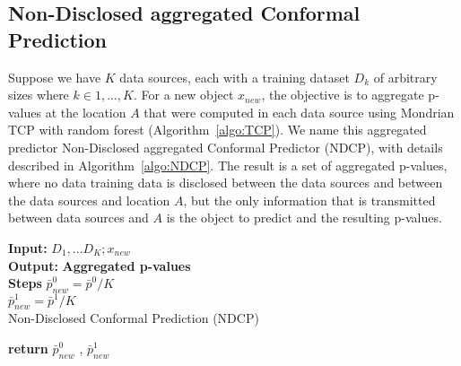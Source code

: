 \documentclass[main]{subfiles}
\begin{document}
\subsection{Non-Disclosed aggregated Conformal Prediction}
%
Suppose we have $K$ data sources, each with a training dataset $D_k$ of arbitrary sizes where $k \in {1,...,K}$. For a new object $x_{new}$, the objective is to aggregate p-values at the location $A$ that were computed in each data source using Mondrian TCP with random forest (Algorithm~\ref{algo:TCP}). We name this aggregated predictor Non-Disclosed aggregated Conformal Predictor (NDCP), with details described in Algorithm~\ref{algo:NDCP}. The result is a set of aggregated p-values, where no data training data is disclosed between the data sources and between the data sources and location $A$, but the only information that is transmitted between data sources and $A$ is the object to predict and the resulting p-values.

 \begin{algorithm}[H]
 \textbf{Input:}{ $D_1,...D_K  ;  x_{new}$}\\
 \textbf{Output:}{\textbf{ Aggregated p-values} }\\
 \textbf{Steps\;}
$\bar{p}_{new}^0 = \bar{p}^0 / K$\\   
$\bar{p}_{new}^1 = \bar{p}^1 / K$\\   
 \caption{Non-Disclosed Conformal Prediction (NDCP)} \label{algo:NDCP}
 \textbf{return} $\bar{p}_{new}^0$ , $\bar{p}_{new}^1$
 \end{algorithm}
 
\end{document}
